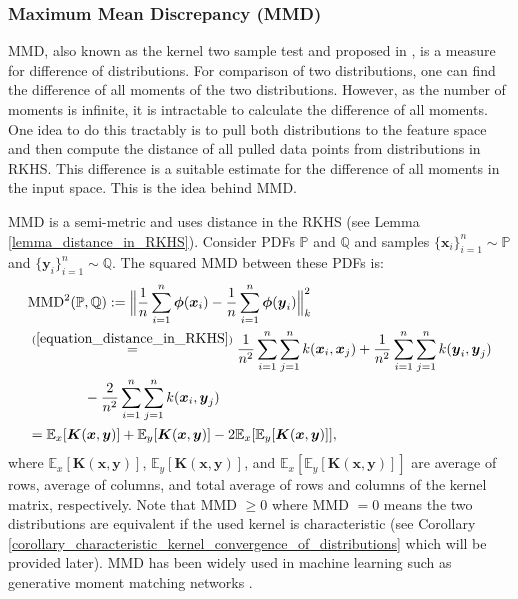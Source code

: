 \documentclass[lang=cn,10pt]{gorgeousnbook}
\numberwithin{equation}{section}%
\numberwithin{figure}{section}%
\begin{document}
\subsubsection{Maximum Mean Discrepancy (MMD)}

MMD, also known as the kernel two sample test and proposed in \cite{gretton2006kernel,gretton2012kernel}, is a measure for difference of distributions. 
For comparison of two distributions, one can find the difference of all moments of the two distributions. However, as the number of moments is infinite, it is intractable to calculate the difference of all moments. One idea to do this tractably is to pull both distributions to the feature space and then compute the distance of all pulled data points from distributions in RKHS. This difference is a suitable estimate for the difference of all moments in the input space. This is the idea behind MMD. 

MMD is a semi-metric \cite{simon2020metrizing} and uses distance in the RKHS \cite{scholkopf2001kernel} (see Lemma \ref{lemma_distance_in_RKHS}). 
Consider PDFs $\mathbb{P}$ and $\mathbb{Q}$ and samples $\{\boldsymbol{x}_i\}_{i=1}^n \sim \mathbb{P}$ and $\{\boldsymbol{y}_i\}_{i=1}^n \sim \mathbb{Q}$.
The squared MMD between these PDFs is:
\begin{align}
&\text{MMD}^2(\mathbb{P}, \mathbb{Q}) := \Big\|\frac{1}{n} \sum_{i=1}^n \boldsymbol{\phi}(\boldsymbol{x}_i) - \frac{1}{n} \sum_{i=1}^n \boldsymbol{\phi}(\boldsymbol{y}_i)\Big\|_k^2 \nonumber \\
&\overset{(\ref{equation_distance_in_RKHS})}{=} \frac{1}{n^2} \sum_{i=1}^n \sum_{j=1}^n k(\boldsymbol{x}_i, \boldsymbol{x}_j) + \frac{1}{n^2} \sum_{i=1}^n \sum_{j=1}^n k(\boldsymbol{y}_i, \boldsymbol{y}_j) \nonumber \\
&~~~~~~~~~~~~ - \frac{2}{n^2} \sum_{i=1}^n \sum_{j=1}^n k(\boldsymbol{x}_i, \boldsymbol{y}_j) \nonumber \\
&= \mathbb{E}_{x}[\boldsymbol{K}(\boldsymbol{x}, \boldsymbol{y})] + \mathbb{E}_{y}[\boldsymbol{K}(\boldsymbol{x}, \boldsymbol{y})] - 2\mathbb{E}_{x}[\mathbb{E}_{y}[\boldsymbol{K}(\boldsymbol{x}, \boldsymbol{y})]], 
\end{align}
where $\mathbb{E}_x[\boldsymbol{K}(\boldsymbol{x}, \boldsymbol{y})]$, $\mathbb{E}_y[\boldsymbol{K}(\boldsymbol{x}, \boldsymbol{y})]$, and $\mathbb{E}_x[\mathbb{E}_y[\boldsymbol{K}(\boldsymbol{x}, \boldsymbol{y})]]$ are average of rows, average of columns, and total average of rows and columns of the kernel matrix, respectively.
Note that MMD $\geq 0$ where MMD $=0$ means the two distributions are equivalent if the used kernel is characteristic (see Corollary \ref{corollary_characteristic_kernel_convergence_of_distributions} which will be provided later). 
MMD has been widely used in machine learning such as generative moment matching networks \cite{li2015generative}.
\end{document}
